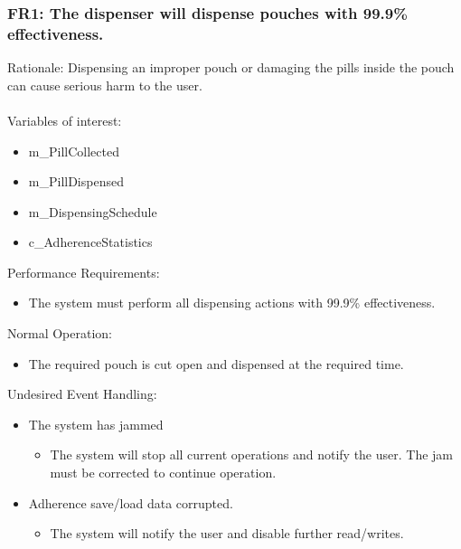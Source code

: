 \documentclass[12pt]{article}
\begin{document}
\subsubsection*{FR1: The dispenser will dispense pouches with 99.9\% effectiveness.} 
Rationale: Dispensing an improper pouch or damaging the pills inside the pouch can cause serious harm to the user.  
\\\\
Variables of interest:
\begin{itemize}[noitemsep,topsep=0pt]
    \item m\_PillCollected
    \item m\_PillDispensed
    \item m\_DispensingSchedule
    \item c\_AdherenceStatistics
\end{itemize} 
\bigskip
Performance Requirements:
\begin{itemize}[noitemsep,topsep=0pt]
    \item The system must perform all dispensing actions with 99.9\% effectiveness.
\end{itemize}
\bigskip
Normal Operation:
\begin{itemize}[noitemsep,topsep=0pt]
    \item The required pouch is cut open and dispensed at the required time.
\end{itemize}
\bigskip
Undesired Event Handling:
\begin{itemize}[noitemsep,topsep=0pt]
    \item The system has jammed
    \begin{itemize}
        \item The system will stop all current operations and notify the user. The jam must be corrected to continue operation.
    \end{itemize}
    \item Adherence save/load data corrupted.
    \begin{itemize}
        \item The system will notify the user and disable further read/writes.
    \end{itemize}
\end{itemize}
\bigskip

\end{document}
